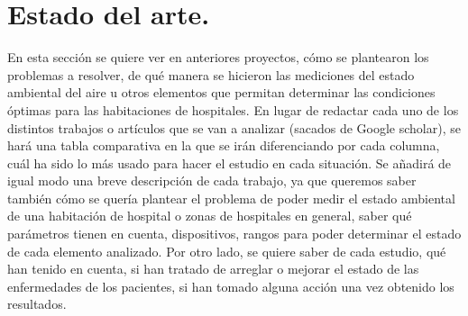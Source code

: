 \chapter{Estado del arte.}

En esta sección se quiere ver en anteriores proyectos, cómo se plantearon los problemas a resolver, de qué manera se hicieron las mediciones del estado ambiental del aire u otros elementos que permitan determinar las condiciones óptimas para las habitaciones de hospitales. 
\vskip 0.1in
En lugar de redactar cada uno de los distintos trabajos o artículos que se van a analizar (sacados de Google scholar), se hará una tabla comparativa en la que se irán diferenciando por cada columna, cuál ha sido lo más usado para hacer el estudio en cada situación.
\vskip 0.1in
Se añadirá de igual modo una breve descripción de cada trabajo, ya que queremos saber también cómo se quería plantear el problema de poder medir el estado ambiental de una habitación de hospital o zonas de hospitales en general, saber qué parámetros tienen en cuenta, dispositivos, rangos para poder determinar el estado de cada elemento analizado. 
\vskip 0.1in
Por otro lado, se quiere saber de cada estudio, qué han tenido en cuenta, si han tratado de arreglar o mejorar el estado de las enfermedades de los pacientes, si han tomado alguna acción una vez obtenido los resultados.

